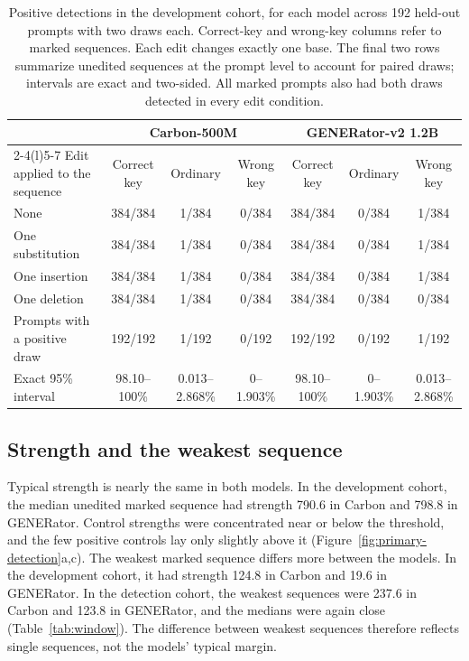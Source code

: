 \documentclass[10pt,twocolumn]{article}
\begin{document}
\begin{table}[tp]
\centering
\caption{Positive detections in the development cohort, for each model across 192 held-out prompts
with two draws each. Correct-key and wrong-key columns refer to marked sequences. Each edit changes
exactly one base. The final two rows summarize unedited sequences at the prompt level to account for
paired draws; intervals are exact and two-sided. All marked prompts also had both draws detected in
every edit condition.}
\label{tab:detection}
\small
\setlength{\tabcolsep}{4pt}
\renewcommand{\arraystretch}{1.08}
\begin{tabular}{@{}lccc@{\hspace{12pt}}ccc@{}}
\toprule
& \multicolumn{3}{c}{\textbf{Carbon-500M}} & \multicolumn{3}{c}{\textbf{GENERator-v2 1.2B}} \\
\cmidrule(lr){2-4}\cmidrule(l){5-7}
Edit applied to the sequence & Correct key & Ordinary & Wrong key & Correct key & Ordinary & Wrong key \\
\midrule
None                 & 384/384 & 1/384 & 0/384 & 384/384 & 0/384 & 1/384 \\
One substitution     & 384/384 & 1/384 & 0/384 & 384/384 & 0/384 & 1/384 \\
One insertion        & 384/384 & 1/384 & 0/384 & 384/384 & 0/384 & 1/384 \\
One deletion         & 384/384 & 1/384 & 0/384 & 384/384 & 0/384 & 0/384 \\
\midrule
Prompts with a positive draw & 192/192 & 1/192 & 0/192 & 192/192 & 0/192 & 1/192 \\
Exact 95\% interval  & 98.10--100\% & 0.013--2.868\% & 0--1.903\% & 98.10--100\% & 0--1.903\% & 0.013--2.868\% \\
\bottomrule
\end{tabular}
\end{table}

\subsection{Strength and the weakest sequence}
\label{supp:weakest}

Typical strength is nearly the same in both models. In the development cohort, the median unedited
marked sequence had strength 790.6 in Carbon and 798.8 in GENERator. Control strengths were
concentrated near or below the threshold, and the few positive controls lay only slightly above it
(Figure~\ref{fig:primary-detection}a,c). The weakest marked sequence differs more between the models.
In the development cohort, it had strength 124.8 in Carbon and 19.6 in GENERator. In the detection
cohort, the weakest sequences were 237.6 in Carbon and 123.8 in GENERator, and the medians were again close
(Table~\ref{tab:window}). The difference between weakest sequences therefore reflects single sequences, not
the models' typical margin.
\end{document}
